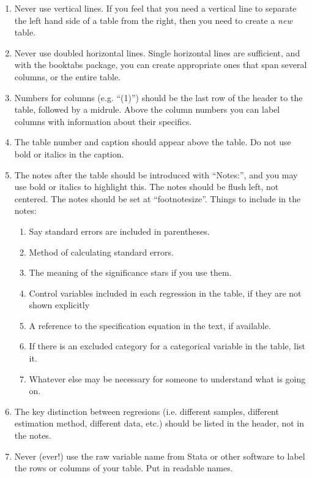 \documentclass[11pt]{article}
\begin{document}
\begin{enumerate}
    \item Never use vertical lines. If you feel that you need a vertical line to separate the left hand side of a table from the right, then you need to create a \textit{new} table.
    \item Never use doubled horizontal lines. Single horizontal lines are sufficient, and with the booktabs package, you can create appropriate ones that span several columns, or the entire table. 
    \item Numbers for columns (e.g. ``(1)'') should be the last row of the header to the table, followed by a midrule. Above the column numbers you can label columns with information about their specifics.
    \item The table number and caption should appear above the table. Do not use bold or italics in the caption. 
    \item The notes after the table should be introduced with ``Notes:'', and you may use bold or italics to highlight this. The notes should be flush left, not centered. The notes should be set at ``footnotesize''. Things to include in the notes:
        \begin{enumerate}
            \item Say standard errors are included in parentheses.
            \item Method of calculating standard errors. 
            \item The meaning of the significance stars if you use them.
            \item Control variables included in each regression in the table, if they are not shown explicitly
            \item A reference to the specification equation in the text, if available.
            \item If there is an excluded category for a categorical variable in the table, list it.
            \item Whatever else may be necessary for someone to understand what is going on. 
        \end{enumerate}
    \item The key distinction between regresions (i.e. different samples, different estimation method, different data, etc.) should be listed in the header, not in the notes.
    \item Never (ever!) use the raw variable name from Stata or other software to label the rows or columns of your table. Put in readable names.

\end{enumerate}
\end{document}
